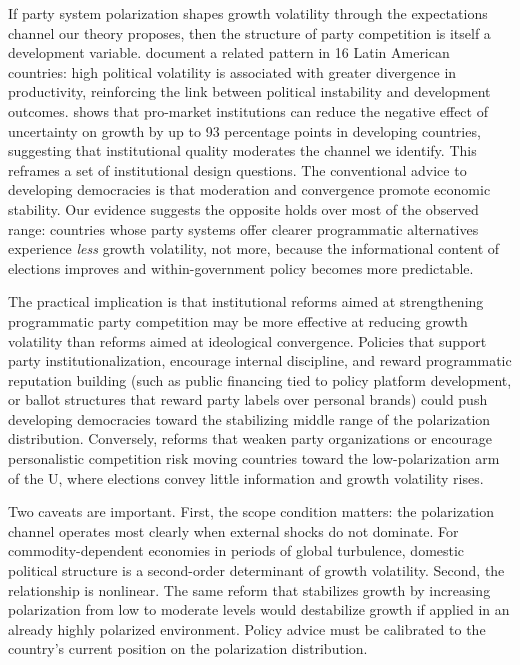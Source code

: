 \documentclass[12pt]{article}
\begin{document}
If party system polarization shapes growth volatility through the
expectations channel our theory proposes, then the structure of party
competition is itself a development variable. \citet{SeffinoGonzalez2025}
document a related pattern in 16 Latin American countries: high political
volatility is associated with greater divergence in productivity,
reinforcing the link between political instability and development
outcomes. \citet{Gomado2025} shows that pro-market institutions can reduce
the negative effect of uncertainty on growth by up to 93 percentage
points in developing countries, suggesting that institutional quality
moderates the channel we identify. This reframes a set of institutional
design questions. The conventional advice to developing
democracies is that moderation and convergence promote economic stability.
Our evidence suggests the opposite holds over most of the observed range:
countries whose party systems offer clearer programmatic alternatives
experience \textit{less} growth volatility, not more, because the
informational content of elections improves and within-government policy
becomes more predictable.

The practical implication is that institutional reforms aimed at
strengthening programmatic party competition may be more effective at
reducing growth volatility than reforms aimed at ideological convergence.
Policies that support party institutionalization, encourage internal
discipline, and reward programmatic reputation building (such as public
financing tied to policy platform development, or ballot structures that
reward party labels over personal brands) could push developing democracies
toward the stabilizing middle range of the polarization distribution.
Conversely, reforms that weaken party organizations or encourage
personalistic competition risk moving countries toward the low-polarization
arm of the U, where elections convey little information and growth
volatility rises.

Two caveats are important. First, the scope condition matters: the
polarization channel operates most clearly when external shocks do not
dominate. For commodity-dependent economies in periods of global turbulence,
domestic political structure is a second-order determinant of growth
volatility. Second, the relationship is nonlinear. The same reform that
stabilizes growth by increasing polarization from low to moderate levels
would destabilize growth if applied in an already highly polarized
environment. Policy advice must be calibrated to the country's current
position on the polarization distribution.
\end{document}
